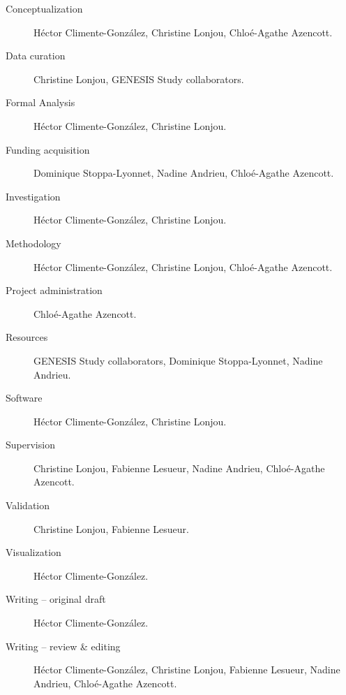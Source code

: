\documentclass[10pt,letterpaper]{article}
\begin{document}
\begin{description}
  \item[Conceptualization] Héctor Climente-González, Christine Lonjou, Chloé-Agathe Azencott.
  \item[Data curation] Christine Lonjou, GENESIS Study collaborators.
  \item[Formal Analysis] Héctor Climente-González, Christine Lonjou.
  \item[Funding acquisition] Dominique Stoppa-Lyonnet, Nadine Andrieu, Chloé-Agathe Azencott.
  \item[Investigation] Héctor Climente-González, Christine Lonjou.
  \item[Methodology] Héctor Climente-González, Christine Lonjou, Chloé-Agathe Azencott.
  \item[Project administration] Chloé-Agathe Azencott.
  \item[Resources] GENESIS Study collaborators, Dominique Stoppa-Lyonnet, Nadine Andrieu.
  \item[Software] Héctor Climente-González, Christine Lonjou.
  \item[Supervision] Christine Lonjou, Fabienne Lesueur, Nadine Andrieu, Chloé-Agathe Azencott.
  \item[Validation] Christine Lonjou, Fabienne Lesueur.
  \item[Visualization] Héctor Climente-González.
  \item[Writing – original draft] Héctor Climente-González.
  \item[Writing – review \& editing] Héctor Climente-González, Christine Lonjou, Fabienne Lesueur, Nadine Andrieu, Chloé-Agathe Azencott.
\end{description}

\nolinenumbers



%
%
% 
\end{document}
